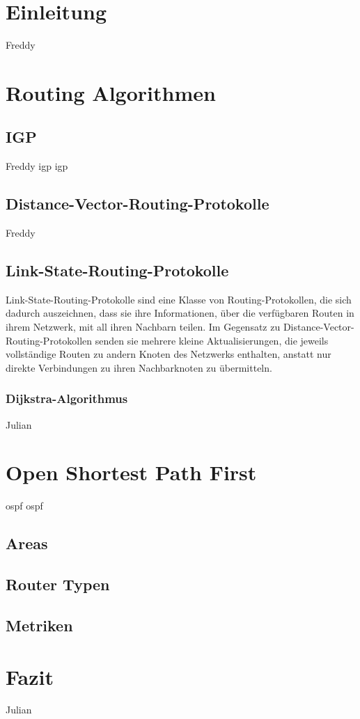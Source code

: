 \documentclass[1pt,a4paper,final]{article}
\begin{document}
\section{Einleitung}
Freddy
\section{Routing Algorithmen}
\subsection{IGP}
Freddy
\ac{igp} \ac{igp}
\subsection{Distance-Vector-Routing-Protokolle}
Freddy
\subsection{Link-State-Routing-Protokolle}
Link-State-Routing-Protokolle sind eine Klasse von Routing-Protokollen, die sich dadurch auszeichnen, dass sie ihre Informationen, über die verfügbaren Routen in ihrem Netzwerk, mit all ihren Nachbarn teilen. Im Gegensatz zu Distance-Vector-Routing-Protokollen senden sie mehrere kleine Aktualisierungen, die jeweils vollständige Routen zu andern Knoten des Netzwerks enthalten, anstatt nur direkte Verbindungen zu ihren Nachbarknoten zu übermitteln.
\subsubsection{Dijkstra-Algorithmus}
Julian
\section{Open Shortest Path First}
\ac{ospf} \ac{ospf}
\subsection{Areas}
\subsection{Router Typen}
\subsection{Metriken}
\section{Fazit}
Julian

\clearpage
\nocite{*}
\printbibliography
\end{document}
